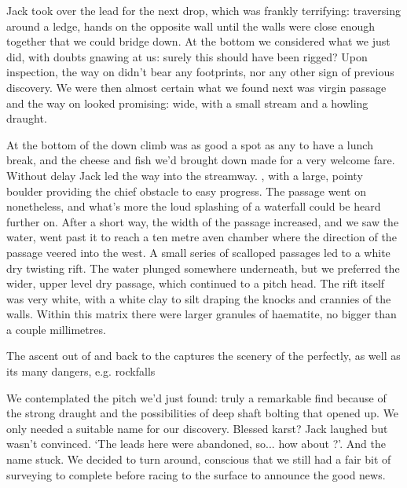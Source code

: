 Jack took over the lead for the next drop, which was frankly terrifying: traversing around a ledge, hands on the opposite wall until the walls were close enough together that we could bridge down. At the bottom we considered what we just did, with doubts gnawing at us: surely this should have been rigged? Upon inspection, the way on didn't bear any footprints, nor any other sign of previous discovery. We were then almost certain what we found next was virgin passage and the way on looked promising: wide, with a small stream and a howling draught.

At the bottom of the down climb was as good a spot as any to have a lunch break, and the cheese and fish we'd brought down made for a very welcome fare. Without delay Jack led the way into the streamway. , with a large, pointy boulder providing the chief obstacle to easy progress. The passage went on nonetheless, and what's more the loud splashing of a waterfall could be heard further on. After a short way, the width of the passage increased, and we saw the water, went past it to reach a ten metre aven chamber where the direction of the passage veered into the west. A small series of scalloped passages led to a white dry twisting rift. The water plunged somewhere underneath, but we preferred the wider, upper level dry passage, which continued to a pitch head. The rift itself was very white, with a white clay to silt draping the knocks and crannies of the walls. Within this matrix there were larger granules of haematite, no bigger than a couple millimetres. 

\begin{marginfigure}
\centering
{}
\caption{The ascent out of  and back to the  captures the scenery of the  perfectly, as well as its many dangers, e.g. rockfalls }
\label{fig:western cliffs}
\end{marginfigure}

We contemplated the pitch we'd just found: truly a remarkable find because of the strong draught and the possibilities of deep shaft bolting that opened up. We only needed a suitable name for our discovery. Blessed karst? Jack laughed but wasn't convinced. `The leads here were abandoned, so... how about ?'. And the name stuck. We decided to turn around, conscious that we still had a fair bit of surveying to complete before racing to the surface to announce the good news. 



